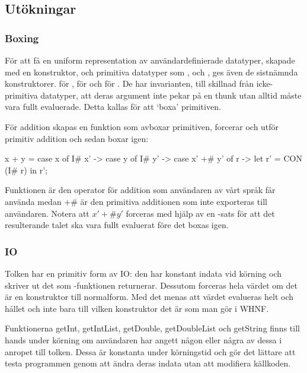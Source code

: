 \documentclass[../Core]{subfiles}
\begin{document}
\subsection{Utökningar}

\subsubsection{Boxing}

För att få en uniform representation av användardefinierade datatyper, skapade
med en konstruktor, och primitiva datatyper som ,  och , ges även 
de sistnämnda konstruktorer.  för ,  för  och 
 för . De har invarianten, till skillnad från icke-primitiva datatyper, 
att deras argument inte pekar på en thunk utan alltid måste vara fullt evaluerade. 
Detta kallas för att `boxa' primitiven.

    För addition skapas en funktion som avboxar primitiven,
forcerar och utför primitiv addition och sedan boxar igen:

\begin{codeEx}
x + y = case x of 
    { I# x' -> case y of
        { I# y' -> case x' +# y' of
            { r -> let r' = CON (I# r) in  r'}}};
\end{codeEx}

Funktionen \ic{+} är den operator för addition som användaren av vårt språk får använda medan $ +\# $ är den
primitiva additionen som inte exporteras till användaren. Notera att $ x' +\# y' $
forceras med hjälp av en -sats för att det resulterande talet ska vara fullt
evaluerat före det boxas igen.

\subsubsection{IO}
Tolken har en primitiv form av IO: den har konstant indata vid körning och
skriver ut det som -funktionen returnerar. Dessutom
forceras hela värdet om det är en konstruktor till normalform. Med det menas
att värdet evalueras helt och hållet och inte bara till vilken konstruktor det är
som man gör i WHNF.

Funktionerna getInt, getIntList, getDouble, getDoubleList och getString finns
till hands under körning om användaren har angett någon eller några av dessa
i anropet till tolken. Dessa är konstanta under körningstid och gör det
lättare att testa programmen genom att ändra deras indata utan att modifiera
källkoden.
\end{document}

